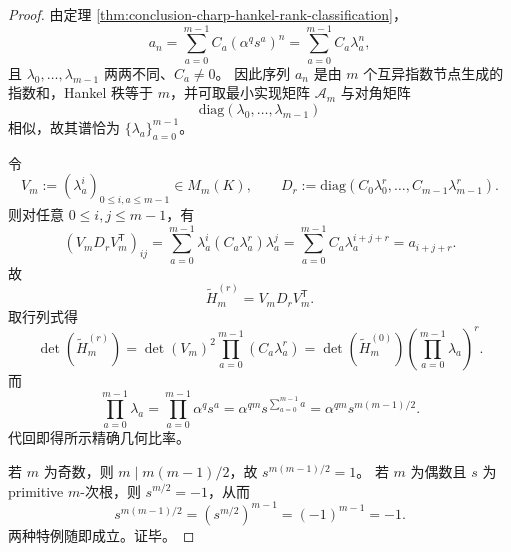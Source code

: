 \begin{proof}
由定理 \ref{thm:conclusion-charp-hankel-rank-classification}，
\[
a_n=\sum_{a=0}^{m-1}C_a(\alpha^q s^a)^n
=\sum_{a=0}^{m-1}C_a\lambda_a^n,
\]
且 \(\lambda_0,\dots,\lambda_{m-1}\) 两两不同、\(C_a\neq 0\)。
因此序列 \(a_n\) 是由 \(m\) 个互异指数节点生成的指数和，Hankel 秩等于 \(m\)，并可取最小实现矩阵 \(\mathcal A_m\) 与对角矩阵
\[
\mathrm{diag}(\lambda_0,\dots,\lambda_{m-1})
\]
相似，故其谱恰为 \(\{\lambda_a\}_{a=0}^{m-1}\)。

令
\[
V_m:=(\lambda_a^i)_{0\le i,a\le m-1}\in M_m(K),
\qquad
D_r:=\mathrm{diag}(C_0\lambda_0^r,\dots,C_{m-1}\lambda_{m-1}^r).
\]
则对任意 \(0\le i,j\le m-1\)，有
\[
(V_mD_rV_m^{\mathsf T})_{ij}
=
\sum_{a=0}^{m-1}\lambda_a^i(C_a\lambda_a^r)\lambda_a^j
=
\sum_{a=0}^{m-1}C_a\lambda_a^{i+j+r}
=
a_{i+j+r}.
\]
故
\[
\widetilde H_m^{(r)}=V_mD_rV_m^{\mathsf T}.
\]
取行列式得
\[
\det(\widetilde H_m^{(r)})
=
\det(V_m)^2\prod_{a=0}^{m-1}(C_a\lambda_a^r)
=
\det(\widetilde H_m^{(0)})\left(\prod_{a=0}^{m-1}\lambda_a\right)^r.
\]
而
\[
\prod_{a=0}^{m-1}\lambda_a
=
\prod_{a=0}^{m-1}\alpha^q s^a
=
\alpha^{qm}s^{\sum_{a=0}^{m-1}a}
=
\alpha^{qm}s^{m(m-1)/2}.
\]
代回即得所示精确几何比率。

若 \(m\) 为奇数，则 \(m\mid m(m-1)/2\)，故 \(s^{m(m-1)/2}=1\)。
若 \(m\) 为偶数且 \(s\) 为 primitive \(m\)-次根，则 \(s^{m/2}=-1\)，从而
\[
s^{m(m-1)/2}=(s^{m/2})^{m-1}=(-1)^{m-1}=-1.
\]
两种特例随即成立。证毕。
\end{proof}

\endinput
